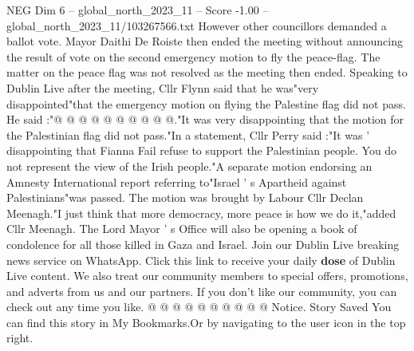 \begin{textsample}{NEG Dim 6 – global\_north\_2023\_11 – Score -1.00 – global\_north\_2023\_11/103267566.txt}
However other councillors demanded a ballot vote.
Mayor Daithi De Roiste then ended the meeting without announcing the result of vote on the second emergency motion to fly the peace-flag.
The matter on the peace flag was not resolved as the meeting then ended.
Speaking to Dublin Live after the meeting, Cllr Flynn said that he was"very disappointed"that the emergency motion on flying the Palestine flag did not pass.
He said :"@ @ @ @ @ @ @ @ @ @."It was very disappointing that the motion for the Palestinian flag did not pass."In a statement, Cllr Perry said :"It was ' disappointing that Fianna Fail refuse to support the Palestinian people.
You do not represent the view of the Irish people."A separate motion endorsing an Amnesty International report referring to"Israel ' s Apartheid against Palestinians"was passed.
The motion was brought by Labour Cllr Declan Meenagh."I just think that more democracy, more peace is how we do it,"added Cllr Meenagh.
The Lord Mayor ' s Office will also be opening a book of condolence for all those killed in Gaza and Israel.
Join our Dublin Live breaking news service on WhatsApp.
Click this link to receive your daily \textbf{dose} of Dublin Live content.
We also treat our community members to special offers, promotions, and adverts from us and our partners.
If you don't like our community, you can check out any time you like. @ @ @ @ @ @ @ @ @ @ Notice.
Story Saved You can find this story in My Bookmarks.Or by navigating to the user icon in the top right.

\end{textsample}
